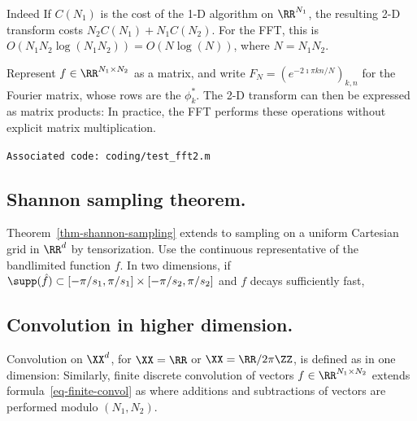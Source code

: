 Indeed
If $C(N_1)$ is the cost of the 1-D algorithm on $\RR^{N_1}$, the resulting 2-D transform costs $N_2 C(N_1)+N_1 C(N_2)$. For the FFT, this is $O(N_1 N_2 \log(N_1 N_2))=O(N \log(N))$, where $N=N_1 N_2$.

Represent $f \in \RR^{N_1 \times N_2}$ as a matrix, and write $F_N=(e^{-2\imath\pi kn/N})_{k,n}$ for the Fourier matrix, whose rows are the $\phi_k^*$. The 2-D transform can then be expressed as matrix products:
In practice, the FFT performs these operations without explicit matrix multiplication.



\texttt{Associated code: coding/test\_fft2.m}


                                                
\subsection{Shannon sampling theorem.}

Theorem~\ref{thm-shannon-sampling} extends to sampling on a uniform Cartesian grid in $\RR^d$ by tensorization. Use the continuous representative of the bandlimited function $f$. In two dimensions, if $\supp(\hat f) \subset [-\pi/s_1,\pi/s_1] \times [-\pi/s_2,\pi/s_2]$ and $f$ decays sufficiently fast,
	

                                                
\subsection{Convolution in higher dimension.}

Convolution on $\XX^d$, for $\XX=\RR$ or $\XX=\RR/2\pi\ZZ$, is defined as in one dimension:
Similarly, finite discrete convolution of vectors $f \in \RR^{N_1 \times N_2}$ extends formula~\eqref{eq-finite-convol} as
where additions and subtractions of vectors are performed modulo $(N_1,N_2)$.


